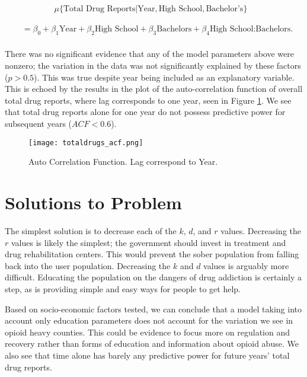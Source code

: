 \documentclass[12pt, letterpaper]{article}
\begin{document}
    \begin{align}
        \mu \{\text{Total\ Drug\ Reports}|\text{Year},\text{High\ School},\text{Bachelor's}\}&
    \end{align}
    
    \begin{align}
        &=\beta_{0}+\beta_{1}\text{Year}+\beta_{2}\text{High\ School}+\beta_{3}\text{Bachelors}+\beta_{4}\text{High\ School:Bachelors}.
    \end{align} \\

There was no significant evidence that any of the model parameters above were nonzero; the variation in the data was not significantly explained by these factors ($p > 0.5$). This was true despite year being included as an explanatory variable. This is echoed by the results in the plot of the auto-correlation function of overall total drug reports, where lag corresponds to one year, seen in Figure \ref{fig:totaldrugs_acf}. We see that total drug reports alone for one year do not possess predictive power for subsequent years ($ACF < 0.6$).

    \begin{figure}[h!]
        \centering
        \texttt{[image: totaldrugs\_acf.png]}
        \caption{Auto Correlation Function. Lag correspond to Year.}
        \label{fig:totaldrugs_acf}
    \end{figure}

\section{Solutions to Problem}
The simplest solution is to decrease each of the $k$, $d$, and $r$ values. Decreasing the $r$ values is likely the simplest; the government should invest in treatment and drug rehabilitation centers. This would prevent the sober population from falling back into the user population. Decreasing the $k$ and $d$ values is arguably more difficult. Educating the population on the dangers of drug addiction is certainly a step, as is providing simple and easy ways for people to get help.

Based on socio-economic factors tested, we can conclude that a model taking into account only education parameters does not account for the variation we see in opioid heavy counties. This could be evidence to focus more on regulation and recovery rather than forms of education and information about opioid abuse. We also see that time alone has barely any predictive power for future years' total drug reports.
\end{document}
